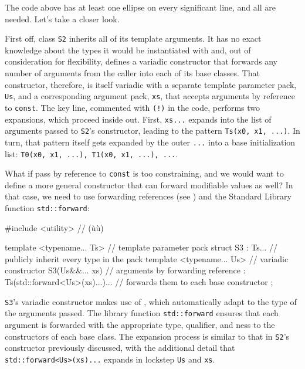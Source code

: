 \noindent The code above has at least one ellipse on every significant line, and
all are needed. Let's take a closer look.

First off, class \lstinline!S2! inherits all of its template arguments. It
has no exact knowledge about the types it would be instantiated with
and, out of consideration for flexibility, defines a variadic
constructor that forwards any number of arguments from the caller into
each of its base classes. That constructor, therefore, is itself
variadic with a separate template parameter pack, \lstinline!Us!, and a
corresponding argument pack, \lstinline!xs!, that accepts arguments by
reference to \lstinline!const!. The key line, commented with \lstinline|(!)|
in the code, performs two expansions, which proceed inside out. First,
\lstinline!xs...! expands into the list of arguments passed to
\lstinline!S2!'s constructor, leading to the pattern
\lstinline!Ts(x0,!~\lstinline!x1,!~\lstinline!...)!. In turn, that pattern itself
gets expanded by the outer \lstinline!...! into a base initialization list:
\lstinline!T0(x0,!~\lstinline!x1,!~\lstinline!...),!~\lstinline!T1(x0,!~\lstinline!x1,!~\lstinline!...),!~\lstinline!...!.

What if pass by reference to \lstinline!const! is too constraining, and we
would want to define a more general constructor that can forward
modifiable values as well? In that case, we need to use forwarding
references (see ) and the Standard Library
function \lstinline!std::forward!:

\begin{emcppslisting}
#include <utility>  // (ù{}ù)

template <typename... Ts>      // template parameter pack
struct S3 : Ts...              // publicly inherit every type in the pack
{
    template <typename... Us>  // variadic constructor
    S3(Us&&... xs)             // arguments by forwarding reference
    : Ts(std::forward<Us>(xs)...)...
                               // forwards them to each base constructor
    { }
};
\end{emcppslisting}
    

\noindent \lstinline!S3!'s variadic constructor makes use of , which automatically adapt to the type of the arguments
passed. The library function \lstinline!std::forward! ensures that each
argument is forwarded with the appropriate type, qualifier, and
ness to the constructors of each base class. The expansion
process is similar to that in \lstinline!S2!'s constructor previously
discussed, with the additional detail that
\lstinline!std::forward<Us>(xs)...! expands in lockstep \lstinline!Us! and
\lstinline!xs!.

